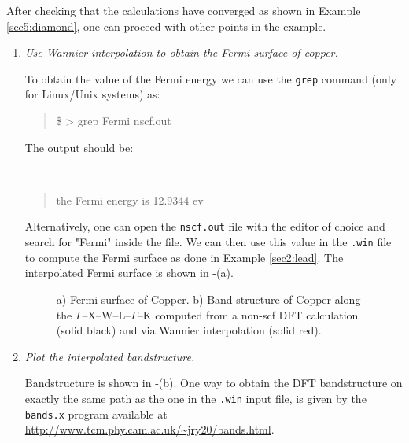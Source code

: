 After checking that the calculations have converged as shown in Example \ref{sec5:diamond}, one can proceed with other points in the example.
\begin{enumerate}
	\item {\it Use Wannier interpolation to obtain the Fermi surface of copper.}

	To obtain the value of the Fermi energy we can use the {\tt grep} command (only for Linux/Unix systems) as:
	{\tt\begin{quote}
	\$ > grep Fermi nscf.out
	\end{quote}
    }
	The output should be:
	{\tt
    \begin{quote}
	     the Fermi energy is    12.9344 ev
	\end{quote}
    }
	Alternatively, one can open the {\tt nscf.out} file with the editor of choice and search for "Fermi" inside the file. 
	We can then use this value in the {\tt .win} file to compute the Fermi surface as done in Example \ref{sec2:lead}.
	The interpolated Fermi surface is shown in -(a).
	\begin{figure}[h!]
	\centering
	\centering
	\caption{a) Fermi surface of Copper. b) Band structure of Copper along the $\Gamma$--X--W--L--$\Gamma$--K computed from a non-scf DFT calculation (solid black) and via Wannier interpolation (solid red).}\label{fig6.1}
	\end{figure}
	\item {\it Plot the interpolated bandstructure.}
	
	Bandstructure is shown in -(b). One way to obtain the DFT bandstructure on exactly the same path as the one in the {\tt .win} input file, is given by the {\tt bands.x} program available at \url{http://www.tcm.phy.cam.ac.uk/~jry20/bands.html}.
\end{enumerate}

